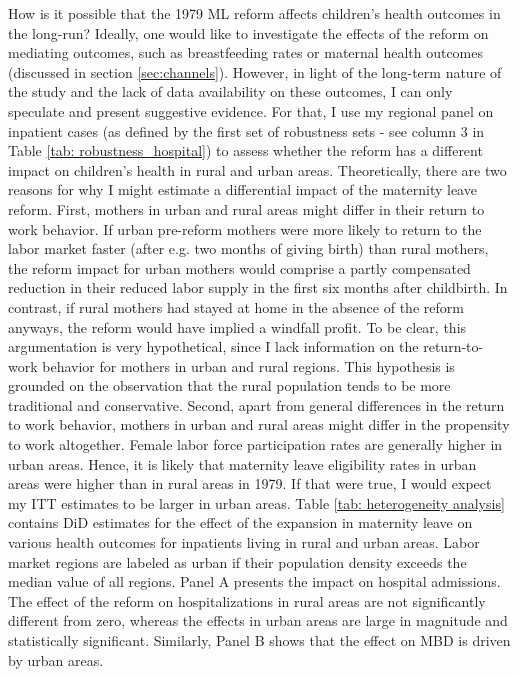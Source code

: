 \documentclass[11pt, a4paper]{article} %
\begin{document}
How is it possible that the 1979 ML reform affects children's health outcomes in the long-run? Ideally, one would like to investigate the effects of the reform on mediating outcomes, such as breastfeeding rates or maternal health outcomes (discussed in section \ref{sec:channels}). However, in light of the long-term nature of the study and the lack of data availability on these outcomes, I can only speculate and present suggestive evidence. For that, I use my regional panel on inpatient cases (as defined by the first set of robustness sets - see column 3 in Table \ref{tab: robustness_hospital}) to assess whether the reform has a different impact on children's health in rural and urban areas. Theoretically, there are two reasons for why I might estimate a differential impact of the maternity leave reform. First, mothers in urban and rural areas might differ in their return to work behavior. If urban pre-reform mothers were more likely to return to the labor market faster (after e.g. two months of giving birth) than rural mothers, the reform impact for urban mothers would comprise a partly compensated reduction in their reduced labor supply in the first six months after childbirth. In contrast, if rural mothers had stayed at home in the absence of the reform anyways, the reform would have implied a windfall profit. To be clear, this argumentation is very hypothetical, since I lack information on the return-to-work behavior for mothers in urban and rural regions. This hypothesis is grounded on the observation that the rural population tends to be more traditional and conservative. Second, apart from general differences in the return to work behavior, mothers in urban and rural areas might differ in the propensity to work altogether. Female labor force participation rates are generally higher in urban areas. Hence, it is likely that maternity leave eligibility rates in urban areas were higher than in rural areas in 1979. If that were true, I would expect my ITT estimates to be larger in urban areas. Table \ref{tab: heterogeneity analysis} contains DiD estimates for the effect of the expansion in maternity leave on various health outcomes for inpatients living in rural and urban areas. Labor market regions are labeled as urban if their population density exceeds the median value of all regions. Panel A presents the impact on hospital admissions. The effect of the reform on hospitalizations in rural areas are not significantly different from zero, whereas the effects in urban areas are large in magnitude and statistically significant. Similarly, Panel B shows that the effect on MBD is driven by urban areas. \newline
\end{document}
